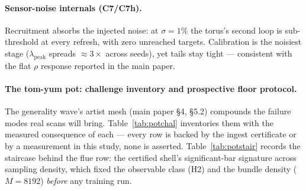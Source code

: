 \paragraph{Sensor-noise internals (C7/C7h).}
Recruitment absorbs the injected noise: at $\sigma{=}1\%$ the torus's
second loop is sub-threshold at every refresh, with zero unreached
targets. Calibration is the noisiest stage ($\lambda_{\mathrm{peak}}$
spreads ${\approx}3\times$ across seeds), yet tails stay tight ---
consistent with the flat $\rho$ response reported in the main paper.

\paragraph{The tom-yum pot: challenge inventory and prospective floor
protocol.}
The generality wave's artist mesh (main paper \S4, \S5.2) compounds the
failure modes real scans will bring. Table~\ref{tab:potchal} inventories
them with the measured consequence of each --- every row is backed by
the ingest certificate or by a measurement in this study, none is
asserted. Table~\ref{tab:potstair} records the staircase behind the flue
row: the certified shell's significant-bar signature across sampling
density, which fixed the observable class (H2) and the bundle density
($M{=}8192$) \emph{before} any training run.

